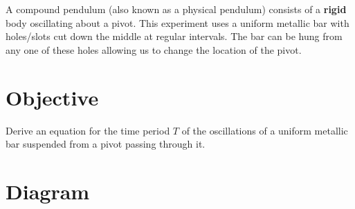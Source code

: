 
A compound pendulum (also known as a physical pendulum) consists of a \textbf{rigid} body oscillating about a pivot. This experiment uses a uniform metallic bar with holes/slots cut down the middle at regular intervals. The bar can be hung from any one of these holes allowing us to change the location of the pivot.

\section{Objective}

Derive an equation for the time period $T$ of the oscillations of a uniform metallic bar suspended from a pivot passing through it.

\section{Diagram}

   \begin{center}
   \end{center}
